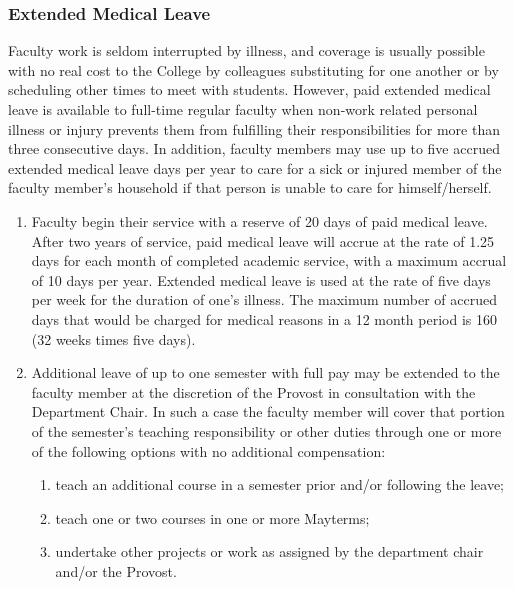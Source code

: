 		\subsubsection{Extended Medical Leave}
			Faculty work is seldom interrupted by illness, and coverage is usually possible with no real cost to the College by colleagues substituting for one another or by scheduling other times to meet with students.  However, paid extended medical leave is available to full-time regular faculty when non-work related personal illness or injury prevents them from fulfilling their responsibilities for more than three consecutive days.  In addition, faculty members may use up to five accrued extended medical leave days per year to care for a sick or injured member of the faculty member's household if that person is unable to care for himself/herself.
			\begin{enumerate}[label=\alph*)]

				\item{ Faculty begin their service with a reserve of 20 days of paid
					medical leave.  After two years of service, paid medical leave will
					accrue at the rate of 1.25 days for each month of completed academic
					service, with a maximum accrual of 10 days per year.  Extended
					medical leave is used at the rate of five days per week for the
					duration of one's illness. The maximum number of accrued days that
					would be charged for medical reasons in a 12 month period is 160 (32
					weeks times five days). }

				\item{ Additional leave of up to one semester with full pay may be
					extended to the faculty member at the discretion of the Provost in
					consultation with the Department Chair.  In such a case the faculty
					member will cover that portion of the semester's teaching
					responsibility or other duties through one or more of the following
					options with no additional compensation:

					\begin{enumerate}[label=\arabic*)]
						\item{ teach an additional course in a semester prior and/or
							following the leave; }

						\item{teach one or two courses in one or more Mayterms;}


						\item{ undertake other projects or work as assigned by the
							department chair and/or the Provost. }
					\end{enumerate}

}
\end{enumerate}
